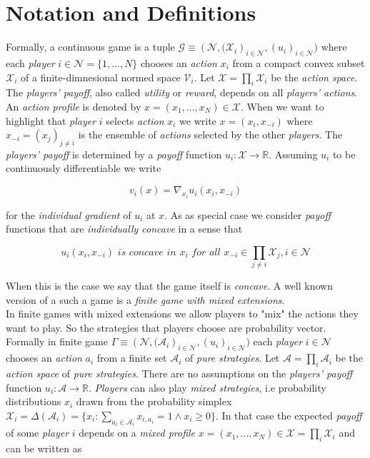 \section{Notation and Definitions}\label{section:notationAndDefinitionsGames}

Formally, a continuous game is a tuple $\mathcal{G} \equiv (\mathcal{N}, {(\mathcal{X}_i})_{i\in\mathcal{N}},{(u_i)}_{i\in\mathcal{N}})$ where each \textit{player} $i \in \mathcal{N} = \{1,\dots,N\}$ chooses an \textit{action} $x_i$ from a compact convex subset $\mathcal{X}_i$ of a finite-dimnesional normed space $\mathcal{V}_i$. Let $\mathcal{X} = \prod_{i}\mathcal{X}_i$ be the \textit{action space}. The \textit{players' payoff}, also called \textit{utility} or \textit{reward}, depends on all \textit{players' actions}. An \textit{action profile} is denoted by $x = (x_1,\dots,x_N) \in \mathcal{X}$. When we want to highlight that \textit{player} $i$ selects \textit{action} $x_i$ we write $x = (x_i,x_{-i})$ where $x_{-i} = {(x_j)}_{j\neq i}$ is the ensemble of \textit{actions} selected by the other \textit{players}. The \textit{players' payoff} is determined by a \textit{payoff }function $u_i : \mathcal{X} \to \mathbb{R} $. Assuming $u_i$ to be continuously differentiable we write 

\begin{equation*}
    v_i(x) = \nabla_{x_i}u_i(x_i,x_{-i})
\end{equation*}

for the \textit{individual gradient} of $u_i$ at $x$. As as special case we consider \textit{payoff} functions that are \textit{individually concave} in a sense that 

\begin{equation}\label{concaveGame}
    u_i(x_i,x_{-i}) \textit{ is concave in $x_i$ for all $x_{-i} \in \prod_{j\neq i}\mathcal{X}_j,i \in \mathcal{N}$}
\end{equation}

When this is the case we say that the game itself is \textit{concave}. A well known version of a such a game is a \textit{finite game with mixed extensions}. \\

In finite games with mixed extensions we allow players to "mix" the actions they want to play. So the strategies that players choose are probability vector. Formally in finite game $\Gamma \equiv (\mathcal{N}, {(\mathcal{A}_i})_{i\in\mathcal{N}},{(u_i)}_{i\in\mathcal{N}})$ each \textit{player} $i \in \mathcal{N}$ chooses an \textit{action} $a_i$ from a finite set $\mathcal{A}_i$ of \textit{pure strategies}. Let $\mathcal{A} = \prod_{i}\mathcal{A}_i$ be the \textit{action space} of \textit{pure strategies}. There are no assumptions on the \textit{players' payoff} function $u_i: \mathcal{A} \to \mathbb{R}$. \textit{Players} can also play \textit{mixed strategies}, i.e probability distributions $x_i$ drawn from the probability simplex $\mathcal{X}_i = \Delta(\mathcal{A}_i)  = \{x_i: \sum_{a_i\in \mathcal{A}_i}x_{i,a_i} = 1 \land x_i \ge 0\}$. In that case the expected \textit{payoff} of some \textit{player} $i$ depends on a \textit{mixed profile} $x = (x_1,\dots,x_N) \in \mathcal{X} = \prod_{i}\mathcal{X}_i$ and can be written as 

